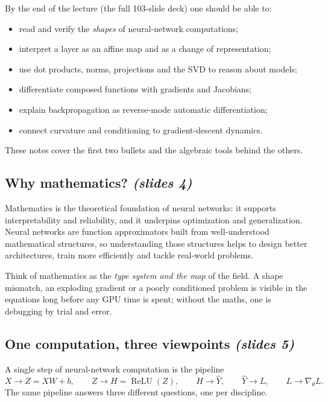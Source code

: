 \documentclass[11pt,a4paper]{article}
\newcommand{\ReLU}{\operatorname{ReLU}}
\newcommand{\slides}[1]{\texorpdfstring{\emph{(slides #1)}}{(slides #1)}}
\theoremstyle{definition}
\theoremstyle{plain}
\begin{document}
By the end of the lecture (the full 103-slide deck) one should be able to:
\begin{itemize}
  \item read and verify the \emph{shapes} of neural-network computations;
  \item interpret a layer as an affine map and as a change of representation;
  \item use dot products, norms, projections and the SVD to reason about models;
  \item differentiate composed functions with gradients and Jacobians;
  \item explain backpropagation as reverse-mode automatic differentiation;
  \item connect curvature and conditioning to gradient-descent dynamics.
\end{itemize}
These notes cover the first two bullets and the algebraic tools behind the others.

\subsection{Why mathematics? \slides{4}}

Mathematics is the theoretical foundation of neural networks: it supports interpretability and reliability, and it underpins optimization and generalization. Neural networks are function approximators built from well-understood mathematical structures, so understanding those structures helps to design better architectures, train more efficiently and tackle real-world problems.

\begin{intuition}
Think of mathematics as the \emph{type system and the map} of the field. A shape mismatch, an exploding gradient or a poorly conditioned problem is visible in the equations long before any GPU time is spent; without the maths, one is debugging by trial and error.
\end{intuition}

\subsection{One computation, three viewpoints \slides{5}}

A single step of neural-network computation is the pipeline
\[
X \to Z = XW + b,\qquad Z \to H = \ReLU(Z),\qquad H \to \hat Y,\qquad \hat Y \to L,\qquad L \to \nabla_\theta L .
\]                                       
The same pipeline answers three different questions, one per discipline.
\end{document}
